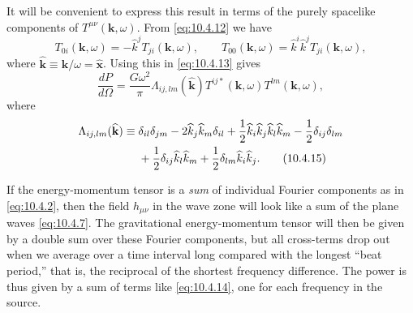 It will be convenient to express this result in terms of the purely spacelike
components of \(T^{\mu\nu}(\mathbf{k},\omega)\). From
\eqref{eq:10.4.12} we have
\[
  T_{0i}(\mathbf{k},\omega)
  =-\widehat k^jT_{ji}(\mathbf{k},\omega),
  \qquad
  T_{00}(\mathbf{k},\omega)
  =\widehat k^i\widehat k^jT_{ji}(\mathbf{k},\omega),
\]
where
\(\widehat{\mathbf{k}}\equiv\mathbf{k}/\omega
=\widehat{\mathbf{x}}\). Using this in \eqref{eq:10.4.13} gives
\begin{equation}
  \frac{dP}{d\Omega}
  =
  \frac{G\omega^2}{\pi}
  \Lambda_{ij,lm}(\widehat{\mathbf{k}})
  T^{ij*}(\mathbf{k},\omega)T^{lm}(\mathbf{k},\omega),
  \tag{10.4.14}\label{eq:10.4.14}
\end{equation}
where
\begin{align}
  \Lambda_{ij,lm}(\widehat{\mathbf{k}})
  \equiv{}&
  \delta_{il}\delta_{jm}
  -2\widehat k_j\widehat k_m\delta_{il}
  +\frac12\widehat k_i\widehat k_j\widehat k_l\widehat k_m
  -\frac12\delta_{ij}\delta_{lm}
  \notag\\
  &+\frac12\delta_{ij}\widehat k_l\widehat k_m
  +\frac12\delta_{lm}\widehat k_i\widehat k_j.
  \tag{10.4.15}\label{eq:10.4.15}
\end{align}

If the energy-momentum tensor is a \emph{sum} of individual Fourier
components as in \eqref{eq:10.4.2}, then the field \(h_{\mu\nu}\) in the
wave zone will look like a sum of the plane waves \eqref{eq:10.4.7}. The
gravitational energy-momentum tensor will then be given by a double sum over
these Fourier components, but all cross-terms drop out when we average over a
time interval long compared with the longest ``beat period,'' that is, the
reciprocal of the shortest frequency difference. The power is thus given by
a sum of terms like \eqref{eq:10.4.14}, one for each frequency in the
source.

